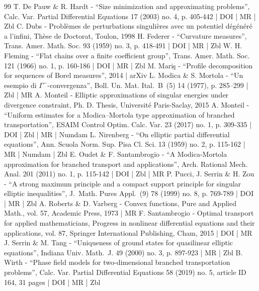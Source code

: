 \begin{thebibliography}{99}
T. De Pauw \& R. Hardt - “Size minimization and approximating problems”, Calc. Var. Partial Differential Equations 17 (2003) no. 4, p. 405-442 | DOI | MR | Zbl
C. Dubs - Problèmes de perturbations singulières avec un potentiel dégénéré a l’infini, Thèse de Doctorat, Toulon, 1998
H. Federer - “Curvature measures”, Trans. Amer. Math. Soc. 93 (1959) no. 3, p. 418-491 | DOI | MR | Zbl
W. H. Fleming - “Flat chains over a finite coefficient group”, Trans. Amer. Math. Soc. 121 (1966) no. 1, p. 160-186 | DOI | MR | Zbl
M. Mariş - “Profile decomposition for sequences of Borel measures”, 2014 | arXiv
L. Modica \& S. Mortola - “Un esempio di $\Gamma ^-$-convergenza”, Boll. Un. Mat. Ital. B (5) 14 (1977), p. 285–299 | Zbl | MR
A. Monteil - Elliptic approximations of singular energies under divergence constraint, Ph. D. Thesis, Université Paris-Saclay, 2015
A. Monteil - “Uniform estimates for a Modica–Mortola type approximation of branched transportation”, ESAIM Control Optim. Calc. Var. 23 (2017) no. 1, p. 309-335 | DOI | Zbl | MR | Numdam
L. Nirenberg - “On elliptic partial differential equations”, Ann. Scuola Norm. Sup. Pisa Cl. Sci. 13 (1959) no. 2, p. 115-162 | MR | Numdam | Zbl
E. Oudet \& F. Santambrogio - “A Modica-Mortola approximation for branched transport and applications”, Arch. Rational Mech. Anal. 201 (2011) no. 1, p. 115-142 | DOI | Zbl | MR
P. Pucci, J. Serrin \& H. Zou - “A strong maximum principle and a compact support principle for singular elliptic inequalities”, J. Math. Pures Appl. (9) 78 (1999) no. 8, p. 769-789 | DOI | MR | Zbl
A. Roberts \& D. Varberg - Convex functions, Pure and Applied Math., vol. 57, Academic Press, 1973 | MR
F. Santambrogio - Optimal transport for applied mathematicians, Progress in nonlinear differential equations and their applications, vol. 87, Springer International Publishing, Cham, 2015 | DOI | MR
J. Serrin \& M. Tang - “Uniqueness of ground states for quasilinear elliptic equations”, Indiana Univ. Math. J. 49 (2000) no. 3, p. 897-923 | MR | Zbl
B. Wirth - “Phase field models for two-dimensional branched transportation problems”, Calc. Var. Partial Differential Equations 58 (2019) no. 5, article ID 164, 31 pages | DOI | MR | Zbl
\end{thebibliography}
